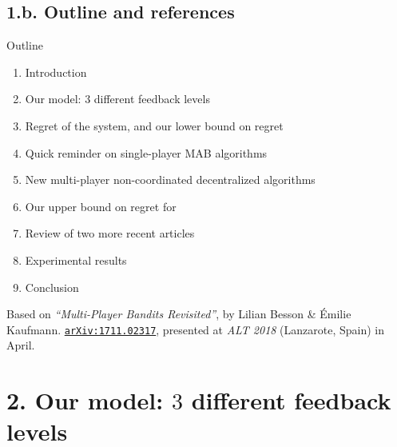 \documentclass[12pt,english,ignorenonframetext,aspectratio=169,]{beamer}
\providecommand{\tightlist}{%
  \setlength{\itemsep}{0pt}\setlength{\parskip}{0pt}}
\begin{document}
\subsection{\hfill{}1.b. Outline and references\hfill{}}

\begin{frame}{Outline }

\vspace*{-15pt}

\begin{enumerate}
\def\labelenumi{\arabic{enumi}.}
\tightlist
\item
  Introduction
\item
  Our model: \(3\) different feedback levels
\item
  Regret of the system, and our lower bound on regret
  \vspace*{10pt}
  \pause
  \item
  Quick reminder on single-player MAB algorithms
  \item
  New multi-player non-coordinated decentralized algorithms
  \item
  Our upper bound on regret for \MCTopM
  \vspace*{10pt}
  \pause
  \item
  Review of two more recent articles
  \item
  Experimental results
  \vspace*{10pt}
  \pause
  \item
  Conclusion
\end{enumerate}

\pause

\vfill{}

\begin{footnotesize}
Based on
\emph{``Multi-Player Bandits Revisited''}, by Lilian Besson \& {\'E}milie Kaufmann.
\texttt{\textcolor{blue}{\href{https://arXiv.org/abs/1711.02317}{arXiv:1711.02317}}}, presented at \emph{ALT 2018} (Lanzarote, Spain) in April.
\end{footnotesize}

\end{frame}



\section{\hfill{}2. Our model: $3$ different feedback levels\hfill{}}
\end{document}
